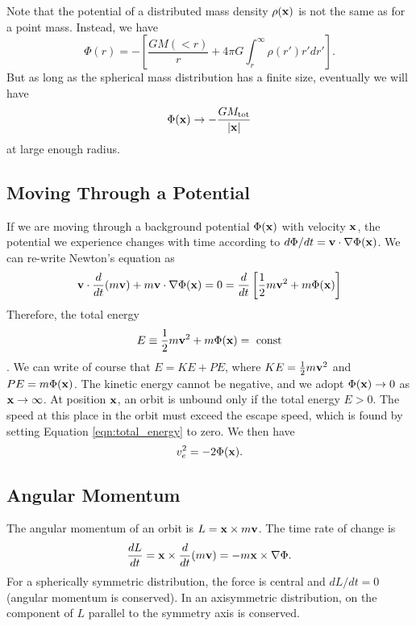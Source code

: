 \documentclass[]{article}
\begin{document}
Note that the potential of a distributed mass density $\rho(\mathbf{x})$
is not the same as for a point mass.  Instead, we have
\begin{equation}
\Phi(r) = - \left[ \frac{GM(<r)}{r} + 4 \pi G \int_{r}^{\infty} \rho(r') r' dr'\right].
\end{equation}
\noindent
But as long as the spherical mass distribution has a finite size, eventually we 
will have
\begin{equation}
\Phi(\mathbf{x}) \to - \frac{G M_{\mathrm{tot}}}{|\mathbf{x}|}
\end{equation}
\noindent
at large enough radius.


\subsection{Moving Through a Potential}

If we are moving through a background potential $\Phi(\mathbf{x})$ with
velocity $\mathbf{x}$, the potential we experience changes
with time according to $d\Phi/dt = \mathbf{v}\cdot\nabla\Phi(\mathbf{x})$.
We can re-write Newton's equation as
\begin{equation}
\mathbf{v} \cdot \frac{d}{dt} ( m\mathbf{v}) + m \mathbf{v}\cdot\nabla \Phi(\mathbf{x}) = 0 = \frac{d}{dt}\left[\frac{1}{2}m\mathbf{v}^{2} + m \Phi(\mathbf{x})\right]
\end{equation}
\noindent
Therefore, the total energy
\begin{equation}
\label{eqn:total_energy}
E \equiv \frac{1}{2} m\mathbf{v}^{2} + m\Phi(\mathbf{x}) =~\mathrm{const}
\end{equation}
\noindent.
We can write of course that $E = KE + PE$, where $KE = \frac{1}{2}m\mathbf{v}^{2}$ and $PE = m\Phi(\mathbf{x})$.
The kinetic energy cannot be negative, and we adopt $\Phi(\mathbf{x})\to0$ as $\mathbf{x}\to\infty$.  At position
$\mathbf{x}$, an orbit is unbound only if the total energy $E>0$. The speed at this place in the
orbit must exceed the escape speed, which is found by setting Equation \ref{eqn:total_energy} to zero.
We then have
\begin{equation}
v_{e}^{2} = - 2 \Phi(\mathbf{x}).
\end{equation}

\subsection{Angular Momentum}

The angular momentum of an orbit is $L = \mathbf{x} \times m\mathbf{v}$. The time rate of change is
\begin{equation}
\frac{dL}{dt} = \mathbf{x} \times \frac{d}{dt} (m \mathbf{v}) = -m\mathbf{x} \times \nabla \Phi.
\end{equation}
\noindent
For a spherically symmetric distribution, the force is central and $dL/dt = 0$ (angular
momentum is conserved).
In an axisymmetric distribution, on the component of $L$ parallel to the symmetry
axis is conserved.
\end{document}
